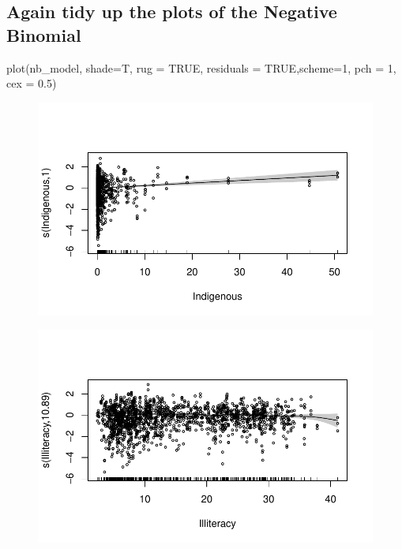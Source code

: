 \documentclass[
  letterpaper,
  DIV=11,
  numbers=noendperiod]{scrartcl}
\newenvironment{Shaded}{\begin{snugshade}}{\end{snugshade}}
\newcommand{\AttributeTok}[1]{\textcolor[rgb]{0.40,0.45,0.13}{#1}}
\newcommand{\ConstantTok}[1]{\textcolor[rgb]{0.56,0.35,0.01}{#1}}
\newcommand{\DecValTok}[1]{\textcolor[rgb]{0.68,0.00,0.00}{#1}}
\newcommand{\FloatTok}[1]{\textcolor[rgb]{0.68,0.00,0.00}{#1}}
\newcommand{\FunctionTok}[1]{\textcolor[rgb]{0.28,0.35,0.67}{#1}}
\newcommand{\NormalTok}[1]{\textcolor[rgb]{0.00,0.23,0.31}{#1}}
\begin{document}
\hypertarget{again-tidy-up-the-plots-of-the-negative-binomial}{%
\subsection{Again tidy up the plots of the Negative
Binomial}\label{again-tidy-up-the-plots-of-the-negative-binomial}}

\begin{Shaded}
\begin{Highlighting}[]
\FunctionTok{plot}\NormalTok{(nb\_model, }\AttributeTok{shade=}\NormalTok{T, }\AttributeTok{rug =} \ConstantTok{TRUE}\NormalTok{, }\AttributeTok{residuals =} \ConstantTok{TRUE}\NormalTok{,}\AttributeTok{scheme=}\DecValTok{1}\NormalTok{,}
\AttributeTok{pch =} \DecValTok{1}\NormalTok{, }\AttributeTok{cex =} \FloatTok{0.5}\NormalTok{)}
\end{Highlighting}
\end{Shaded}

\begin{figure}[H]

{\centering \includegraphics{Group34Coursework_files/figure-pdf/unnamed-chunk-17-1.pdf}

}

\end{figure}

\begin{figure}[H]

{\centering \includegraphics{Group34Coursework_files/figure-pdf/unnamed-chunk-17-2.pdf}

}

\end{figure}
\end{document}
